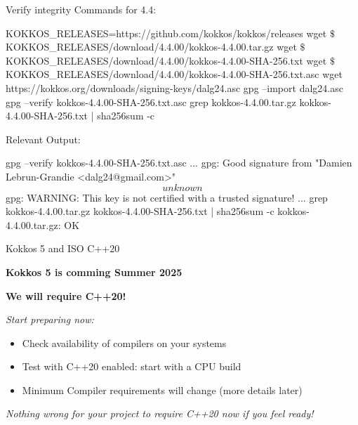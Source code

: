 \begin{frame}[fragile]{Verify integrity}
Commands for 4.4:
\begin{code}
KOKKOS_RELEASES=https://github.com/kokkos/kokkos/releases
wget $\$${KOKKOS_RELEASES}/download/4.4.00/kokkos-4.4.00.tar.gz
wget $\$${KOKKOS_RELEASES}/download/4.4.00/kokkos-4.4.00-SHA-256.txt
wget $\$${KOKKOS_RELEASES}/download/4.4.00/kokkos-4.4.00-SHA-256.txt.asc
wget https://kokkos.org/downloads/signing-keys/dalg24.asc
gpg --import dalg24.asc
gpg --verify kokkos-4.4.00-SHA-256.txt.asc
grep kokkos-4.4.00.tar.gz kokkos-4.4.00-SHA-256.txt | sha256sum -c
\end{code}

Relevant Output:
\begin{code}
gpg --verify kokkos-4.4.00-SHA-256.txt.asc
  ...
  gpg: Good signature from "Damien Lebrun-Grandie <dalg24@gmail.com>" \[unknown\]
  gpg: WARNING: This key is not certified with a trusted signature!
  ...
grep kokkos-4.4.00.tar.gz kokkos-4.4.00-SHA-256.txt | sha256sum -c
  kokkos-4.4.00.tar.gz: OK
\end{code}
\end{frame}

\begin{frame}[fragile]{Kokkos 5 and ISO C++20}
\begin{center}
\textbf{Kokkos 5 is comming Summer 2025}

\vspace{0.5cm}
\textbf{We will require C++20!}
\end{center}

\textit{Start preparing now:}
\begin{itemize}
  \item{Check availability of compilers on your systems}
  \item{Test with C++20 enabled: start with a CPU build}
  \item{Minimum Compiler requirements will change (more details later)}
\end{itemize}

\vspace{0.5cm}
\begin{center}
\textit{Nothing wrong for your project to require C++20 now if you feel ready!}
\end{center}
\end{frame}

